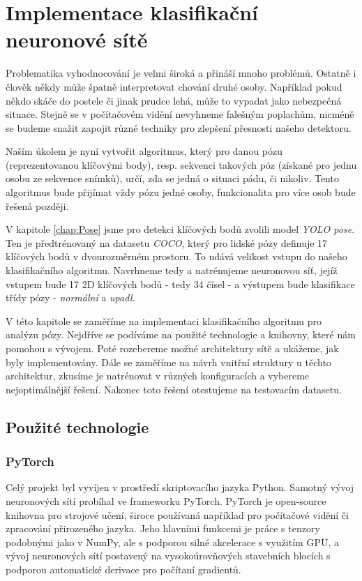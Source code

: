 \chapter{Implementace klasifikační neuronové sítě}
\label{chap:ClassificationImplementation}

Problematika vyhodnocování je velmi široká a přináší mnoho problémů. Ostatně i
člověk někdy může špatně interpretovat chování druhé osoby. Například pokud
někdo skáče do postele či jinak prudce lehá, může to vypadat jako nebezpečná
situace. Stejně se v počítačovém vidění nevyhneme falešným poplachům, nicméně
se budeme snažit zapojit různé techniky pro zlepšení přesnosti našeho
detektoru.

Naším úkolem je nyní vytvořit algoritmus, který pro danou pózu (reprezentovanou
klíčovými body), resp. sekvenci takových póz (získané pro jednu osobu ze
sekvence snímků), určí, zda se jedná o situaci pádu, či nikoliv. Tento
algoritmus bude přijímat vždy pózu jedné osoby, funkcionalita pro více osob
bude řešená později.

V kapitole \ref{chap:Pose} jsme pro detekci klíčových bodů zvolili model
\textit{YOLO pose}. Ten je předtrénovaný na datasetu \textit{COCO}, který pro
lidské pózy definuje 17 klíčových bodů v dvourozměrném prostoru. To udává
velikost vstupu do našeho klasifikačního algoritmu. Navrhneme tedy a
natrénujeme neuronovou síť, jejíž vstupem bude 17 2D klíčových bodů - tedy 34
čísel - a výstupem bude klasifikace třídy pózy - \textit{normální} a
\textit{upadl}.

V této kapitole se zaměříme na implementaci klasifikačního algoritmu pro
analýzu pózy. Nejdříve se podíváme na použité technologie a knihovny, které nám
pomohou s vývojem. Poté rozebereme možné architektury sítě a ukážeme, jak byly
implementovány. Dále se zaměříme na návrh vnitřní struktury u těchto
architektur, zkusíme je natrénovat v různých konfiguracích a vybereme
nejoptimálnější řešení. Nakonec toto řešení otestujeme na testovacím datasetu.

\section{Použité technologie}

\subsection{PyTorch}

Celý projekt byl vyvíjen v prostředí skriptovacího jazyka Python. Samotný vývoj
neuronových sítí probíhal ve frameworku PyTorch. PyTorch je open-source
knihovna pro strojové učení, široce používaná například pro počítačové vidění
či zpracování přirozeného jazyka. Jeho hlavními funkcemi je práce s tenzory
podobnými jako v NumPy, ale s podporou silné akcelerace s využitím GPU, a vývoj
neuronových sítí postavený na vysokoúrovňových stavebních blocích s podporou
automatické derivace pro počítaní gradientů.

